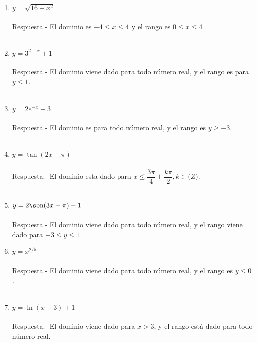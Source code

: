 \begin{enumerate}[\bfseries 1.]
\item $y=\sqrt{16-x^2}$\\\\
    Respuesta.-\; El dominio es $-4\leq x \leq 4$ y el rango es $0\leq x \leq 4$\\\\

\item $y=3^{2-x}+1$\\\\
    Respuesta.-\; El dominio viene dado para todo número real, y el rango es para $y\leq 1$.\\\\

\item $y=2e^{-x} - 3$\\\\
    Respuesta.-\; El dominio es para todo número real, y el rango es $y\geq -3$.\\\\

\item $y=\tan(2x-\pi)$\\\\
    Respuesta.-\; El dominio esta dado para $x\leq \dfrac{3\pi}{4} + \dfrac{k\pi}{2}, k\in \mathbb(Z)$.\\\\

\item $y=2\sen(3x+\pi)-1$\\\\
    Respuesta.-\; El dominio viene dado para todo número real, y el rango viene dado para $-3\leq y \leq 1$

\item $y=x^{2/5}$\\\\
    Respuesta.-\; El dominio viene dado para todo número real, y el rango es $y\leq 0$.\\\\

\item $y=\ln(x-3)+1$\\\\
    Respuesta.-\; El dominio viene dado para $x>3$, y el rango está dado para todo número real.\\\\


\end{enumerate}
